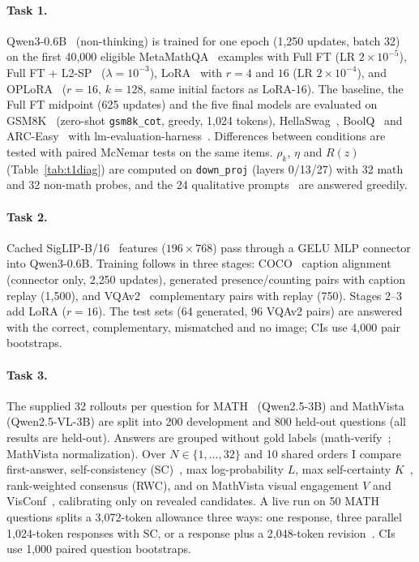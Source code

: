 \documentclass{article}
\begin{document}
\paragraph{Task 1.} Qwen3-0.6B~\citep{yang2025qwen3} (non-thinking) is trained for one epoch (1{,}250 updates, batch 32) on the first 40{,}000 eligible MetaMathQA~\citep{yu2024metamath} examples with Full FT (LR $2\times10^{-5}$), Full FT + L2-SP~\citep{li2018l2sp} ($\lambda=10^{-3}$), LoRA~\citep{hu2022lora} with $r=4$ and $16$ (LR $2\times10^{-4}$), and OPLoRA~\citep{xiong2025oplora} ($r=16$, $k=128$, same initial factors as LoRA-16). The baseline, the Full FT midpoint (625 updates) and the five final models are evaluated on GSM8K~\citep{cobbe2021gsm8k} (zero-shot \texttt{gsm8k\_cot}, greedy, 1{,}024 tokens), HellaSwag~\citep{zellers2019hellaswag}, BoolQ~\citep{clark2019boolq} and ARC-Easy~\citep{clark2018arc} with lm-evaluation-harness~\citep{evalharness}. Differences between conditions are tested with paired McNemar tests on the same items. $\rho_k$, $\eta$ and $R(z)$ (Table~\ref{tab:t1diag}) are computed on \texttt{down\_proj} (layers 0/13/27) with 32 math and 32 non-math probes, and the 24 qualitative prompts~\citep{betley2025emergent} are answered greedily.

\paragraph{Task 2.} Cached SigLIP-B/16~\citep{zhai2023siglip} features ($196\times768$) pass through a GELU MLP connector into Qwen3-0.6B. Training follows \citet{liu2023llava} in three stages: COCO~\citep{lin2014coco} caption alignment (connector only, 2{,}250 updates), generated presence/counting pairs with caption replay (1{,}500), and VQAv2~\citep{goyal2017vqa2} complementary pairs with replay (750). Stages 2--3 add LoRA ($r=16$). The test sets (64 generated, 96 VQAv2 pairs) are answered with the correct, complementary, mismatched and no image; CIs use 4{,}000 pair bootstraps.

\paragraph{Task 3.} The supplied 32 rollouts per question for MATH~\citep{hendrycks2021math} (Qwen2.5-3B) and MathVista~\citep{lu2024mathvista} (Qwen2.5-VL-3B) are split into 200 development and 800 held-out questions (all results are held-out). Answers are grouped without gold labels (math-verify~\citep{mathverify}; MathVista normalization). Over $N\in\{1,\dots,32\}$ and 10 shared orders I compare first-answer, self-consistency (SC)~\citep{wang2023selfconsistency}, max log-probability $L$, max self-certainty $K$~\citep{kang2025selfcertainty}, rank-weighted consensus (RWC), and on MathVista visual engagement $V$ and VisConf~\citep{usman2025visconf}, calibrating only on revealed candidates. A live run on 50 MATH questions splits a 3{,}072-token allowance three ways: one response, three parallel 1{,}024-token responses with SC, or a response plus a 2{,}048-token revision~\citep{madaan2023selfrefine}. CIs use 1{,}000 paired question bootstraps.
\end{document}
